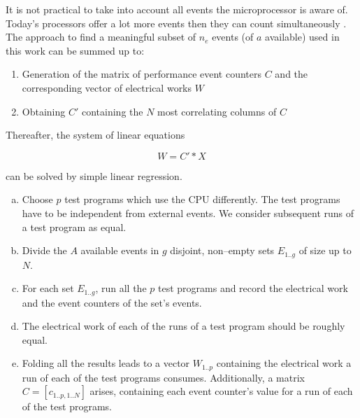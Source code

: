 \label{sec:min-events}

It is not practical to take into account all events the microprocessor is aware
of. Today's processors offer a lot more events then they can count
simultaneously \cite{intel2011softdev1}. The approach to find a meaningful
subset of $n_e$ events (of $a$ available) used in this work can be summed up to:

\begin{enumerate}

\item Generation of the matrix of performance event counters $C$ and
the corresponding vector of electrical works $W$

\item Obtaining $C'$ containing the $N$ most correlating columns of $C$

\end{enumerate}

Thereafter, the system of linear equations

\begin{equation}
W = C' * X
\end{equation}

can be solved by simple linear regression.



\begin{enumerate}[(a)]

\item Choose $p$ test programs which use the CPU differently. The test
programs have to be independent from external events. We consider subsequent
runs of a test program as equal.

\item Divide the $A$ available events in $g$ disjoint, non--empty sets
$E_{1..g}$ of size up to $N$.

\item For each set $E_{1..g}$, run all the $p$ test programs and record the
electrical work and the event counters of the set's events.

\item The electrical work of each of the runs of a test program should be
roughly equal.

\item Folding all the results leads to a vector $W_{1..p}$ containing the
electrical work a run of each of the test programs consumes. Additionally, a
matrix $C = [c_{1..p,1..N}]$ arises, containing each event counter's value for a
run of each of the test programs.

\end{enumerate}

